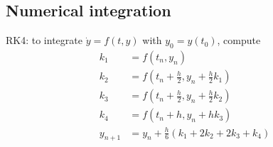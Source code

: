 \subsection{Numerical integration}
RK4: to integrate $\dot{y} = f(t, y)$ with $y_0 = y(t_0)$, compute
\begin{align*}
  k_1 &= f(t_n, y_n) \\
  k_2 &= f(t_n + \frac h 2, y_n + \frac h 2 k_1) \\
  k_3 &= f(t_n + \frac h 2, y_n + \frac h 2 k_2) \\
  k_4 &= f(t_n + h, y_n + h k_3) \\
  y_{n+1} &= y_n + \frac h 6 (k_1 + 2k_2 + 2k_3 + k_4) 
\end{align*}

